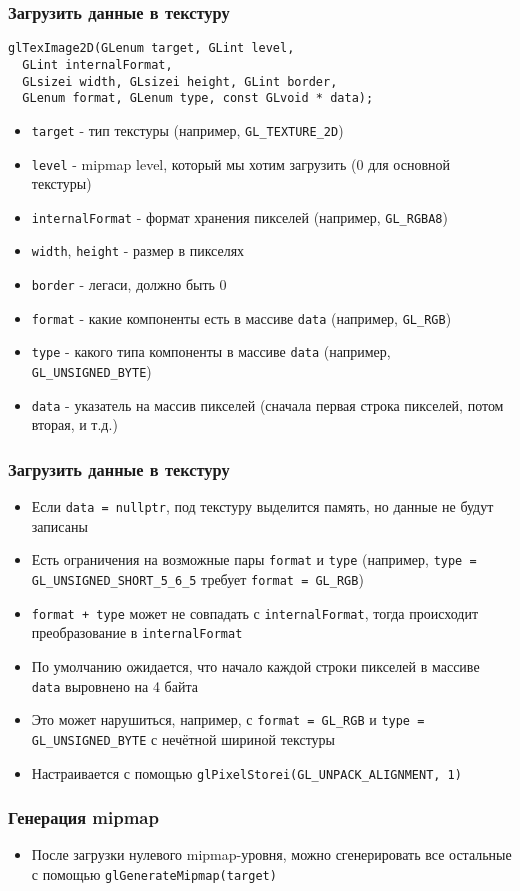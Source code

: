 \documentclass{beamer}
\begin{document}
\begin{frame}[fragile]
\frametitle{Загрузить данные в текстуру}
\begin{verbatim}
glTexImage2D(GLenum target, GLint level,
  GLint internalFormat,
  GLsizei width, GLsizei height, GLint border,
  GLenum format, GLenum type, const GLvoid * data);
\end{verbatim}
\begin{itemize}
\item \verb|target| - тип текстуры (например, \verb|GL_TEXTURE_2D|)
\item \verb|level| - mipmap level, который мы хотим загрузить (0 для основной текстуры)
\item \verb|internalFormat| - формат хранения пикселей (например, \verb|GL_RGBA8|)
\item \verb|width|, \verb|height| - размер в пикселях
\item \verb|border| - легаси, должно быть 0
\item \verb|format| - какие компоненты есть в массиве \verb|data| (например, \verb|GL_RGB|)
\item \verb|type| - какого типа компоненты в массиве \verb|data| (например, \verb|GL_UNSIGNED_BYTE|)
\item \verb|data| - указатель на массив пикселей (сначала первая строка пикселей, потом вторая, и т.д.)
\end{itemize}
\end{frame}

\begin{frame}[fragile]
\frametitle{Загрузить данные в текстуру}
\begin{itemize}
\item Если \verb|data = nullptr|, под текстуру выделится память, но данные не будут записаны
\pause
\item Есть ограничения на возможные пары \verb|format| и \verb|type| (например, \verb|type = GL_UNSIGNED_SHORT_5_6_5| требует \verb|format = GL_RGB|)
\pause
\item \verb|format + type| может не совпадать с \verb|internalFormat|, тогда происходит преобразование в \verb|internalFormat|
\pause
\item По умолчанию ожидается, что начало каждой строки пикселей в массиве \verb|data| выровнено на 4 байта
\item Это может нарушиться, например, с \verb|format = GL_RGB| и \verb|type = GL_UNSIGNED_BYTE| с нечётной шириной текстуры
\item Настраивается с помощью \verb|glPixelStorei(GL_UNPACK_ALIGNMENT, 1)|
\end{itemize}
\end{frame}

\begin{frame}[fragile]
\frametitle{Генерация mipmap}
\begin{itemize}
\item После загрузки нулевого mipmap-уровня, можно сгенерировать все остальные с помощью \verb|glGenerateMipmap(target)|
\end{itemize}
\end{frame}
\end{document}
